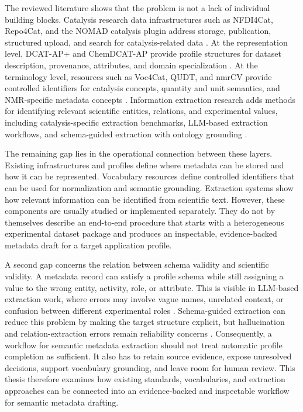 The reviewed literature shows that the problem is not a lack of individual building blocks.
Catalysis research data infrastructures such as \ac{NFDI4Cat}, Repo4Cat, and the \ac{NOMAD} catalysis plugin address storage, publication, structured upload, and search for catalysis-related data \cite{wulf2021unified,kushnarenko2025repo4cat,schumann2025nomad}.
At the representation level, \ac{DCAT-AP+} and \ac{ChemDCAT-AP} provide profile structures for dataset description, provenance, attributes, and domain specialization \cite{dcatapplusDocumentation,chemdcatapDocumentation,stroemert2026chemdcat}.
At the terminology level, resources such as \ac{Voc4Cat}, \ac{QUDT}, and \ac{nmrCV} provide controlled identifiers for catalysis concepts, quantity and unit semantics, and \ac{NMR}-specific metadata concepts \cite{david_linke_2023_8313340,qudt2022schema,Schober2018nmrML}.
Information extraction research adds methods for identifying relevant scientific entities, relations, and experimental values, including catalysis-specific extraction benchmarks, \ac{LLM}-based extraction workflows, and schema-guided extraction with ontology grounding \cite{zhang2022knowledge,walls2025catminer,caufield2024spires}.

The remaining gap lies in the operational connection between these layers.
Existing infrastructures and profiles define where metadata can be stored and how it can be represented.
Vocabulary resources define controlled identifiers that can be used for normalization and semantic grounding.
Extraction systems show how relevant information can be identified from scientific text.
However, these components are usually studied or implemented separately.
They do not by themselves describe an end-to-end procedure that starts with a heterogeneous experimental dataset package and produces an inspectable, evidence-backed metadata draft for a target application profile.

A second gap concerns the relation between schema validity and scientific validity.
A metadata record can satisfy a profile schema while still assigning a value to the wrong entity, activity, role, or attribute.
This is visible in \ac{LLM}-based extraction work, where errors may involve vague names, unrelated context, or confusion between different experimental roles \cite{walls2025catminer}.
Schema-guided extraction can reduce this problem by making the target structure explicit, but hallucination and relation-extraction errors remain reliability concerns \cite{caufield2024spires}.
Consequently, a workflow for semantic metadata extraction should not treat automatic profile completion as sufficient.
It also has to retain source evidence, expose unresolved decisions, support vocabulary grounding, and leave room for human review.
This thesis therefore examines how existing standards, vocabularies, and extraction approaches can be connected into an evidence-backed and inspectable workflow for semantic metadata drafting.
